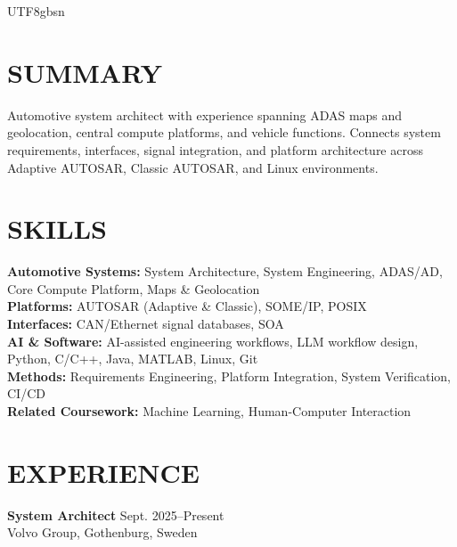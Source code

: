 \documentclass[margin, 10pt]{res} %
\begin{document}
\begin{resume}
\begin{CJK}{UTF8}{gbsn}


\section{SUMMARY}
Automotive system architect with experience spanning ADAS maps and geolocation, central compute platforms, and vehicle functions. Connects system requirements, interfaces, signal integration, and platform architecture across Adaptive AUTOSAR, Classic AUTOSAR, and Linux environments.


\section{SKILLS}
\textbf{Automotive Systems:} System Architecture, System Engineering, ADAS/AD, Core Compute Platform, Maps \& Geolocation\\
\textbf{Platforms:} AUTOSAR (Adaptive \& Classic), SOME/IP, POSIX\\
\textbf{Interfaces:} CAN/Ethernet signal databases, SOA\\
\textbf{AI \& Software:} AI-assisted engineering workflows, LLM workflow design, Python, C/C++, Java, MATLAB, Linux, Git\\
\textbf{Methods:} Requirements Engineering, Platform Integration, System Verification, CI/CD\\
\textbf{Related Coursework:} Machine Learning, Human-Computer Interaction


\section{EXPERIENCE}

\textbf{System Architect} \hfill Sept. 2025–Present \\
Volvo Group, Gothenburg, Sweden


\end{CJK}
\end{resume}
\end{document}
